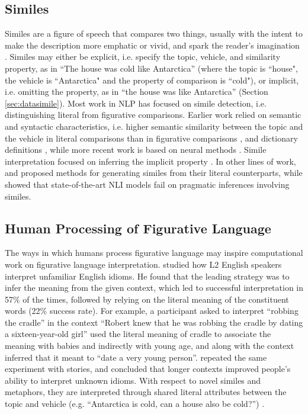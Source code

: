 \subsection{Similes}
\label{sec:bg_similes}

Similes are a figure of speech that compares two things, usually with the intent to make the description more emphatic or vivid, and spark the reader's imagination \cite{definition}. Similes may either be explicit, i.e. specify the topic, vehicle, and similarity property, as in ``The house was cold like Antarctica'' (where the topic is ``house", the vehicle is ``Antarctica" and the property of comparison is ``cold"), or implicit, i.e. omitting the property, as in ``the house was like Antarctica'' (Section \ref{sec:datasimile}). Most work in NLP has focused on simile detection, i.e. distinguishing literal from
figurative comparisons. Earlier work relied on semantic and syntactic characteristics, i.e. higher semantic similarity between the topic and the vehicle in literal comparisons than in figurative comparisons \cite{niculae-danescu-niculescu-mizil-2014-brighter,qadir-etal-2015-learning,mpouli-2017-annotating}, and dictionary definitions \cite{qadir-etal-2016-automatically}, while more recent work is based on neural methods \cite{liu-etal-2018-neural,zeng2020neural}. Simile interpretation focused on inferring the implicit property \cite{qadir-etal-2016-automatically}. In other lines of work,  and  proposed methods for generating similes from their literal counterparts, while  showed that state-of-the-art NLI models fail on pragmatic inferences involving similes.  

\subsection{Human Processing of Figurative Language}
\label{sec:processing}

The ways in which humans process figurative language may inspire computational work on figurative language interpretation.  studied how L2 English speakers interpret unfamiliar English idioms. He found that the leading strategy was to infer the meaning from the given context, which led to successful interpretation in 57\% of the times, followed by relying on the literal meaning of the constituent words (22\% success rate). For example, a participant asked to interpret ``robbing the cradle'' in the context ``Robert knew that he was robbing the cradle by dating a sixteen-year-old girl'' used the literal meaning of cradle to associate the meaning with babies and indirectly with young age, and along with the context inferred that it meant to ``date a very young person''.  repeated the same experiment with stories, and concluded that longer contexts improved people's ability to interpret unknown idioms. With respect to novel similes and metaphors, they are interpreted through shared literal attributes between the topic and vehicle (e.g. ``Antarctica is cold, can a house also be cold?'') \cite{Wolff2000EvidenceFR,carston_wearing_2011}. 

